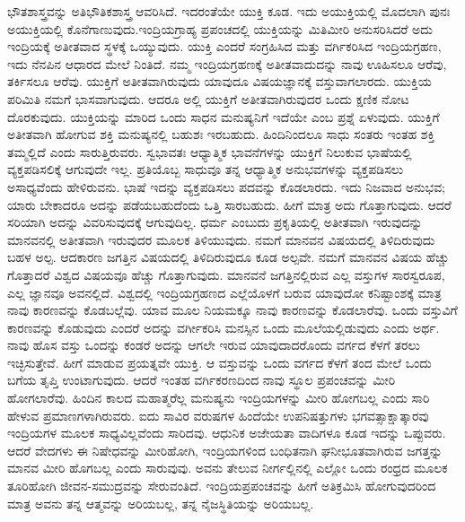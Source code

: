 ಭೌತಶಾಸ್ತ್ರವನ್ನು ಅತಿಭೌತಿಕಶಾಸ್ತ್ರ ಆವರಿಸಿದೆ. ಇದರಂತೆಯೇ ಯುಕ್ತಿ ಕೂಡ. ಇದು ಅಯುಕ್ತಿಯಲ್ಲಿ ಮೊದಲಾಗಿ ಪುನಃ ಅಯುಕ್ತಿಯಲ್ಲಿ ಕೊನೆಗಾಣುವುದು.\break ಇಂದ್ರಿಯಗ್ರಾಹ್ಯ ಪ್ರಪಂಚದಲ್ಲಿ ಯುಕ್ತಿಯನ್ನು ಮಿತಿಮೀರಿ ಅನುಸರಿಸಿದರೆ ಅದು ಇಂದ್ರಿಯಕ್ಕೆ ಅತೀತವಾದ ಸ್ಥಳಕ್ಕೆ ಒಯ್ಯುವುದು. ಯುಕ್ತಿ ಎಂದರೆ ಸಂಗ್ರಹಿಸಿದ ಮತ್ತು ವರ್ಗಿಕರಿಸಿದ ಇಂದ್ರಿಯಗ್ರಹಣ, ಇದು ನೆನಪಿನ ಆಧಾರದ ಮೇಲೆ ನಿಂತಿದೆ. ನಮ್ಮ ಇಂದ್ರಿಯಗ್ರಹಣಕ್ಕೆ ಅತೀತವಾದುದನ್ನು ನಾವು ಊಹಿಸಲೂ ಆರೆವು, ತರ್ಕಿಸಲೂ ಆರೆವು. ಯುಕ್ತಿಗೆ ಅತೀತವಾಗಿರುವುದು ಯಾವುದೂ ವಿಷಯಜ್ಞಾನಕ್ಕೆ ವಸ್ತುವಾಗಲಾರದು. ಯುಕ್ತಿಯ ಪರಿಮಿತಿ ನಮಗೆ ಭಾಸವಾಗುವುದು. ಆದರೂ ಅಲ್ಲಿ ಯುಕ್ತಿಗೆ ಅತೀತವಾಗಿರುವುದರ ಒಂದು ಕ್ಷಣಿಕ ನೋಟ ದೊರಕುವುದು. ಯುಕ್ತಿಯನ್ನು ಮಾರಿದ ಒಂದು ಸಾಧನ ಮನುಷ್ಯನಿಗೆ ಇದೆಯೇ ಎಂಬ ಪ್ರಶ್ನೆ ಏಳುವುದು. ಯುಕ್ತಿಗೆ ಅತೀತವಾಗಿ ಹೋಗುವ ಶಕ್ತಿ ಮನುಷ್ಯನಲ್ಲಿ ಬಹುಶಃ ಇರಬಹುದು. ಹಿಂದಿನಿಂದಲೂ ಸಾಧು ಸಂತರು ಇಂತಹ ಶಕ್ತಿ ತಮ್ಮಲ್ಲಿದೆ ಎಂದು ಸಾರುತ್ತಿರುವರು. ಸ್ವಭಾವತಃ ಆಧ್ಯಾತ್ಮಿಕ ಭಾವನೆಗಳನ್ನು ಯುಕ್ತಿಗೆ ನಿಲುಕುವ ಭಾಷೆಯಲ್ಲಿ ವ್ಯಕ್ತಪಡಿಸಲಿಕ್ಕೆ ಆಗುವುದೇ ಇಲ್ಲ. ಪ್ರತಿಯೊಬ್ಬ ಸಾಧುವೂ ತನ್ನ ಆಧ್ಯಾತ್ಮಿಕ ಅನುಭವಗಳನ್ನು ವ್ಯಕ್ತಪಡಿಸಲು ಅಸಾಧ್ಯವೆಂದು ಹೇಳಿರುವನು. ಭಾಷೆ ಇದನ್ನು ವ್ಯಕ್ತಪಡಿಸಲು ಪದವನ್ನು ಕೊಡಲಾರದು. ಇದು ನಿಜವಾದ ಅನುಭವ; ಯಾರು ಬೇಕಾದರೂ ಅದನ್ನು ಪಡೆಯಬಹುದೆಂದು ಒತ್ತಿ ಸಾರಬಹುದು. ಹೀಗೆ ಮಾತ್ರ ಅದು ಗೊತ್ತಾಗುವುದು. ಆದರೆ ಸರಿಯಾಗಿ ಅದನ್ನು ವಿವರಿಸುವುದಕ್ಕೆ ಆಗುವುದಿಲ್ಲ. ಧರ್ಮ ಎಂಬುದು ಪ್ರಕೃತಿಯಲ್ಲಿ ಅತೀತವಾಗಿ ಇರುವುದನ್ನು ಮಾನವನಲ್ಲಿ ಅತೀತವಾಗಿ ಇರುವುದರ ಮೂಲಕ ತಿಳಿಯುವುದು. ನಮಗೆ ಮಾನವನ ವಿಷಯದಲ್ಲಿ ತಿಳಿದಿರುವುದು ಬಹಳ ಅಲ್ಪ. ಆದಕಾರಣ ಜಗತ್ತಿನ ವಿಷಯದಲ್ಲಿ ತಿಳಿದಿರುವುದೂ ಕೂಡ ಅಲ್ಪವೇ. ನಮಗೆ ಮಾನವನ ವಿಷಯ ಹೆಚ್ಚು ಗೊತ್ತಾದರೆ ವಿಶ್ವದ ವಿಷಯವೂ ಹೆಚ್ಚು ಗೊತ್ತಾಗುವುದು. ಮಾನವನೆ ಜಗತ್ತಿನಲ್ಲಿರುವ ಎಲ್ಲ ವಸ್ತುಗಳ ಸಾರಸ್ವರೂಪ, ಎಲ್ಲ ಜ್ಞಾನವೂ ಅವನಲ್ಲಿದೆ. ವಿಶ್ವದಲ್ಲಿ ಇಂದ್ರಿಯಗ್ರಹಣದ ಎಲ್ಲೆಯೊಳಗೆ ಬರುವ ಯಾವುದೋ ಕನಿಷ್ಟಾಂಶಕ್ಕೆ ಮಾತ್ರ ನಾವು ಕಾರಣವನ್ನು ಕೊಡಬಲ್ಲೆವು. ಯಾವ ಮೂಲ ನಿಯಮಕ್ಕೂ ನಾವು ಕಾರಣವನ್ನು ಕೊಡಲಾರೆವು. ಒಂದು ವಸ್ತುವಿಗೆ ಕಾರಣವನ್ನು ಕೊಡುವುದು ಎಂದರೆ ಅದನ್ನು ವರ್ಗೀಕರಿಸಿ ಮನಸ್ಸಿನ ಒಂದು ಮೂಲೆಯಲ್ಲಿಡುವುದು ಎಂದು ಅರ್ಥ. ನಾವು ಹೊಸ ವಸ್ತು ಒಂದನ್ನು ಕಂಡರೆ ಅದನ್ನು ಆಗಲೇ ಇರುವ ಯಾವುದಾದರೊಂದು ವರ್ಗದ ಕೆಳಗೆ ತರಲು ಇಚ್ಛಿಸುತ್ತೇವೆ. ಹೀಗೆ ಮಾಡುವ ಪ್ರಯತ್ನವೇ ಯುಕ್ತಿ. ಆ ವಸ್ತುವನ್ನು ಒಂದು ವರ್ಗದ ಕೆಳಗೆ ತಂದ ಮೇಲೆ ಒಂದು ಬಗೆಯ ತೃಪ್ತಿ ಉಂಟಾಗುವುದು. ಆದರೆ ಇಂತಹ ವರ್ಗಿಕರಣದಿಂದ ನಾವು ಸ್ಥೂಲ ಪ್ರಪಂಚವನ್ನು ಮೀರಿ ಹೋಗಲಾರೆವು. ಹಿಂದಿನ ಕಾಲದ ಮಹಾತ್ಮರೆಲ್ಲ ಮನುಷ್ಯನು ಇಂದ್ರಿಯಗಳನ್ನು ಮೀರಿ ಹೋಗಬಲ್ಲ ಎಂದು ಸಾರಿ ಹೇಳುವ ಪ್ರಮಾಣಗಳಾಗಿರುವರು. ಐದು ಸಾವಿರ ವರುಷಗಳ ಹಿಂದೆಯೇ ಉಪನಿಷತ್ತುಗಳು ಭಗವತ್ಸಾಕ್ಷಾತ್ಕಾರವು ಇಂದ್ರಿಯಗಳ ಮೂಲಕ ಸಾಧ್ಯವಿಲ್ಲವೆಂದು ಸಾರಿದವು. ಆಧುನಿಕ ಅಜೇಯತಾ ವಾದಿಗಳೂ ಕೂಡ ಇದನ್ನು ಒಪ್ಪುವರು. ಆದರೆ ವೇದಗಳು ಈ ನಿಷೇಧವನ್ನು ಮೀರಿಹೋಗಿ, ಇಂದ್ರಿಯಗಳಿಂದ ಬಂಧಿತನಾಗಿ ಘನೀಭೂತವಾಗಿರುವ ಜಗತ್ತನ್ನು ಮಾನವ ಮೀರಿ ಹೊಗಬಲ್ಲ ಎಂದು ಸಾರುವುವು. ಅವನು ತೇಲುವ ನೀರ್ಗಲ್ಲಿನಲ್ಲಿ ಎಲ್ಲೋ ಒಂದು ರಂಧ್ರದ ಮೂಲಕ ತೂರಿಹೋಗಿ ಜೀವನ-ಸಮುದ್ರವನ್ನು ಸೇರುವಂತಿದೆ. ಇಂದ್ರಿಯಪ್ರಪಂಚವನ್ನು ಹೀಗೆ ಅತಿಕ್ರಮಿಸಿ ಹೋಗುವುದರಿಂದ ಮಾತ್ರ ಅವನು ತನ್ನ ಆತ್ಮವನ್ನು ಅರಿಯಬಲ್ಲ, ತನ್ನ ನೈಜಸ್ಥಿತಿಯನ್ನು ಅರಿಯಬಲ್ಲ.

